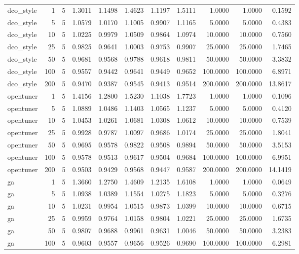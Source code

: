 \begin{table}[t]
\begin{tabular}{lrrrrrrrrrr}
dco\_style & 1 & 5 & 1.3011 & 1.1498 & 1.4623 & 1.1197 & 1.5111 & 1.0000 & 1.0000 & 0.1592 \\
dco\_style & 5 & 5 & 1.0579 & 1.0170 & 1.1005 & 0.9907 & 1.1165 & 5.0000 & 5.0000 & 0.4383 \\
dco\_style & 10 & 5 & 1.0225 & 0.9979 & 1.0509 & 0.9864 & 1.0974 & 10.0000 & 10.0000 & 0.7560 \\
dco\_style & 25 & 5 & 0.9825 & 0.9641 & 1.0003 & 0.9753 & 0.9907 & 25.0000 & 25.0000 & 1.7465 \\
dco\_style & 50 & 5 & 0.9681 & 0.9568 & 0.9788 & 0.9618 & 0.9811 & 50.0000 & 50.0000 & 3.3832 \\
dco\_style & 100 & 5 & 0.9557 & 0.9442 & 0.9641 & 0.9449 & 0.9652 & 100.0000 & 100.0000 & 6.8971 \\
dco\_style & 200 & 5 & 0.9470 & 0.9387 & 0.9545 & 0.9413 & 0.9514 & 200.0000 & 200.0000 & 13.8617 \\
opentuner & 1 & 5 & 1.4156 & 1.2800 & 1.5230 & 1.1038 & 1.7723 & 1.0000 & 1.0000 & 0.1096 \\
opentuner & 5 & 5 & 1.0889 & 1.0486 & 1.1403 & 1.0565 & 1.1237 & 5.0000 & 5.0000 & 0.4120 \\
opentuner & 10 & 5 & 1.0453 & 1.0261 & 1.0681 & 1.0308 & 1.0612 & 10.0000 & 10.0000 & 0.7539 \\
opentuner & 25 & 5 & 0.9928 & 0.9787 & 1.0097 & 0.9686 & 1.0174 & 25.0000 & 25.0000 & 1.8041 \\
opentuner & 50 & 5 & 0.9695 & 0.9578 & 0.9822 & 0.9508 & 0.9894 & 50.0000 & 50.0000 & 3.5153 \\
opentuner & 100 & 5 & 0.9578 & 0.9513 & 0.9617 & 0.9504 & 0.9684 & 100.0000 & 100.0000 & 6.9951 \\
opentuner & 200 & 5 & 0.9503 & 0.9429 & 0.9568 & 0.9447 & 0.9587 & 200.0000 & 200.0000 & 14.1419 \\
ga & 1 & 5 & 1.3660 & 1.2750 & 1.4609 & 1.2135 & 1.6108 & 1.0000 & 1.0000 & 0.0649 \\
ga & 5 & 5 & 1.0938 & 1.0389 & 1.1554 & 1.0275 & 1.1823 & 5.0000 & 5.0000 & 0.3276 \\
ga & 10 & 5 & 1.0231 & 0.9954 & 1.0515 & 0.9873 & 1.0399 & 10.0000 & 10.0000 & 0.6715 \\
ga & 25 & 5 & 0.9959 & 0.9764 & 1.0158 & 0.9804 & 1.0221 & 25.0000 & 25.0000 & 1.6735 \\
ga & 50 & 5 & 0.9807 & 0.9688 & 0.9961 & 0.9631 & 1.0046 & 50.0000 & 50.0000 & 3.2383 \\
ga & 100 & 5 & 0.9603 & 0.9557 & 0.9656 & 0.9526 & 0.9690 & 100.0000 & 100.0000 & 6.2981 \\

\end{tabular}
\end{table}
